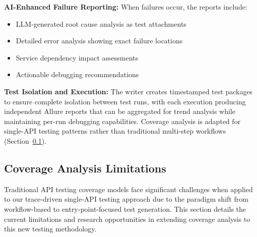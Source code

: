\documentclass[conference]{IEEEtran}
\begin{document}
\textbf{AI-Enhanced Failure Reporting:} When failures occur, the reports include:
\begin{itemize}[leftmargin=*]
\item LLM-generated root cause analysis as test attachments
\item Detailed error analysis showing exact failure locations
\item Service dependency impact assessments
\item Actionable debugging recommendations
\end{itemize}

\textbf{Test Isolation and Execution:} The writer creates timestamped test packages to ensure complete isolation between test runs, with each execution producing independent Allure reports that can be aggregated for trend analysis while maintaining per-run debugging capabilities. Coverage analysis is adapted for single-API testing patterns rather than traditional multi-step workflows (Section~\ref{sec:coverage-limitations}).



\subsection{Coverage Analysis Limitations}\label{sec:coverage-limitations}

Traditional API testing coverage models face significant challenges when applied to our trace-driven single-API testing approach due to the paradigm shift from workflow-based to entry-point-focused test generation. This section details the current limitations and research opportunities in extending coverage analysis to this new testing methodology.
\end{document}
